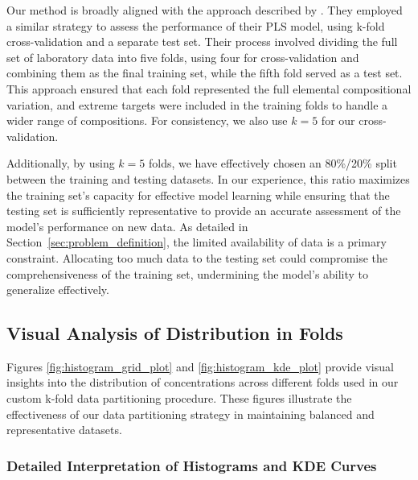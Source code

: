 Our method is broadly aligned with the approach described by \citet{andersonImprovedAccuracyQuantitative2017}.
They employed a similar strategy to assess the performance of their PLS model, using k-fold cross-validation and a separate test set.
Their process involved dividing the full set of laboratory data into five folds, using four for cross-validation and combining them as the final training set, while the fifth fold served as a test set.
This approach ensured that each fold represented the full elemental compositional variation, and extreme targets were included in the training folds to handle a wider range of compositions.
For consistency, we also use \(k=5\) for our cross-validation.

Additionally, by using $k=5$ folds, we have effectively chosen an 80\%/20\% split between the training and testing datasets.
In our experience, this ratio maximizes the training set's capacity for effective model learning while ensuring that the testing set is sufficiently representative to provide an accurate assessment of the model's performance on new data.
As detailed in Section~\ref{sec:problem_definition}, the limited availability of data is a primary constraint.
Allocating too much data to the testing set could compromise the comprehensiveness of the training set, undermining the model's ability to generalize effectively.

\subsection{Visual Analysis of  Distribution in Folds}

Figures \ref{fig:histogram_grid_plot} and \ref{fig:histogram_kde_plot} provide visual insights into the distribution of  concentrations across different folds used in our custom k-fold data partitioning procedure.
These figures illustrate the effectiveness of our data partitioning strategy in maintaining balanced and representative datasets.

\subsubsection{Detailed Interpretation of Histograms and KDE Curves}

